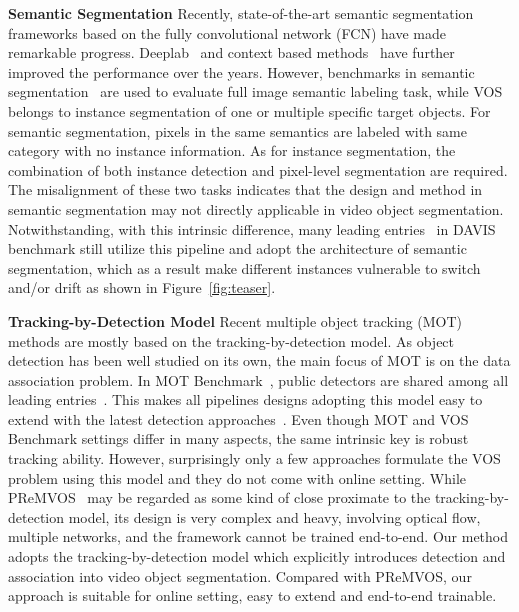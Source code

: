 \documentclass[10pt,twocolumn,letterpaper]{article}
\begin{document}
\textbf{Semantic Segmentation}
Recently, state-of-the-art semantic segmentation frameworks based on the fully convolutional network (FCN) \cite{long2015fcn} have made remarkable progress.
Deeplab~\cite{chen2014deeplabv1, chen2017deeplabv2, chen2017deeplabv3, chen2018deeplabv3plus} and context based methods~\cite{zhao2017pyramid, wang2018non, fu2019dual, zhao2018psanet, huang2018ccnet} have further improved the performance over the years.
However, benchmarks in semantic segmentation~\cite{Cordts2016Cityscapes, zhou2017scene} are used to evaluate full image semantic labeling task, while VOS belongs to instance segmentation of one or multiple specific target objects.
For semantic segmentation, pixels in the same semantics are labeled with same category with no instance information.
As for instance segmentation, the combination of both instance detection and pixel-level segmentation are required.
The misalignment of these two tasks indicates that the design and method in semantic segmentation may not directly applicable in video object segmentation. Notwithstanding,
with this intrinsic difference, many leading entries~\cite{khoreva2017lucid, caelles2017osvos, voigtlaender2017online, bao2018cnn, voigtlaender2019feelvos, wang2019ranet, oh2018fast} in DAVIS benchmark still utilize this pipeline and adopt the  architecture of semantic segmentation, which as a result make different instances vulnerable to switch and/or drift as shown in Figure~\ref{fig:teaser}.

\textbf{Tracking-by-Detection Model}
Recent multiple object tracking (MOT) methods are mostly based on the tracking-by-detection model.
As object detection has been well studied on its own, the main focus of MOT is on the data association problem. In MOT Benchmark~\cite{MOTChallenge2015, MOT16}, public detectors are shared among all leading entries~\cite{sadeghian2017tracking, xu2019spatial}.
This makes all pipelines designs adopting this model easy to extend with the latest detection approaches~\cite{ross2010dpm, ren2015faster, he2017mask, lin2017feature, lin2017focal, dai2017deformable, cai2018cascade}.
Even though MOT and VOS Benchmark settings differ in many aspects, the same intrinsic key is robust tracking ability.
However, surprisingly only a few approaches formulate the VOS problem using this model and they do not come with online setting. While
PReMVOS~\cite{luiten2018premvos} may be regarded as some kind of close proximate to the tracking-by-detection model, its design is very complex and heavy, involving optical flow, multiple networks, and the framework cannot be trained end-to-end. 
Our method adopts the tracking-by-detection model which explicitly introduces detection and association into video object segmentation.
Compared with PReMVOS, our approach is suitable for online setting, easy to extend and end-to-end trainable.
\end{document}
